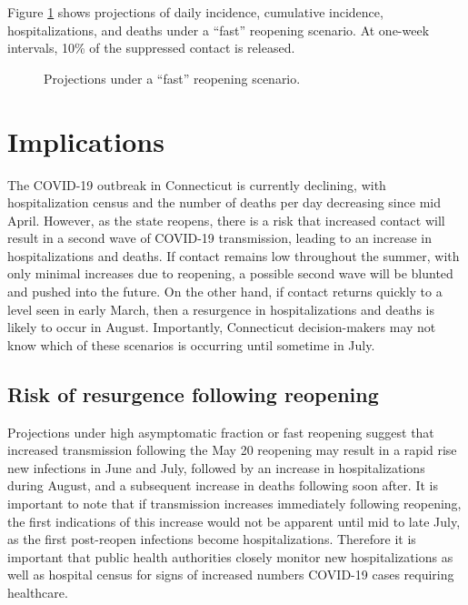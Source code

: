 \documentclass[11pt]{article}
\newcommand{\comment}[1]{[\textcolor{red}{#1}]}
\begin{document}
Figure \ref{fig:fast} shows projections of daily incidence, cumulative incidence, hospitalizations, and deaths under a ``fast'' reopening scenario. At one-week intervals, 10\% of the suppressed contact is released.   

\begin{figure}
\centering
\comment{fast reopen placeholder}
\caption{Projections under a ``fast'' reopening scenario. }
\label{fig:fast}
\end{figure}






\section*{Implications}

The COVID-19 outbreak in Connecticut is currently declining, with hospitalization census and the number of deaths per day decreasing since mid April.  However, as the state reopens, there is a risk that increased contact will result in a second wave of COVID-19 transmission, leading to an increase in hospitalizations and deaths.  If contact remains low throughout the summer, with only minimal increases due to reopening, a possible second wave will be blunted and pushed into the future.  On the other hand, if contact returns quickly to a level seen in early March, then a resurgence in hospitalizations and deaths is likely to occur in August.  Importantly, Connecticut decision-makers may not know which of these scenarios is occurring until sometime in July.  


\subsection*{Risk of resurgence following reopening} 

Projections under high asymptomatic fraction or fast reopening suggest that increased transmission following the May 20 reopening may result in a rapid rise new infections in June and July, followed by an increase in hospitalizations during August, and a subsequent increase in deaths following soon after.  It is important to note that if transmission increases immediately following reopening, the first indications of this increase would not be apparent until mid to late July, as the first post-reopen infections become hospitalizations.  Therefore it is important that public health authorities closely monitor new hospitalizations as well as hospital census for signs of increased numbers COVID-19 cases requiring healthcare.   
\end{document}
